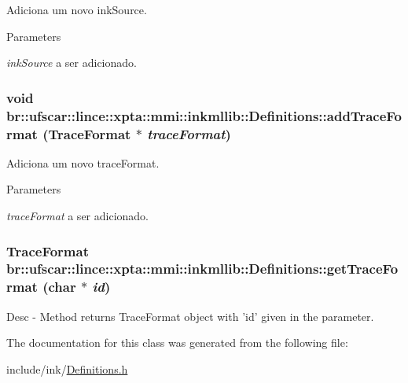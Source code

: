 Adiciona um novo inkSource. 


\begin{DoxyParams}{Parameters}
\item[{\em inkSource}]a ser adicionado. \end{DoxyParams}
\hypertarget{classbr_1_1ufscar_1_1lince_1_1xpta_1_1mmi_1_1inkmllib_1_1Definitions_afb1a42b76226bfb4e7bfb57d3a7d814f}{
\subsubsection[{addTraceFormat}]{\setlength{\rightskip}{0pt plus 5cm}void br::ufscar::lince::xpta::mmi::inkmllib::Definitions::addTraceFormat (TraceFormat $\ast$ {\em traceFormat})}}
\label{classbr_1_1ufscar_1_1lince_1_1xpta_1_1mmi_1_1inkmllib_1_1Definitions_afb1a42b76226bfb4e7bfb57d3a7d814f}


Adiciona um novo traceFormat. 


\begin{DoxyParams}{Parameters}
\item[{\em traceFormat}]a ser adicionado. \end{DoxyParams}
\hypertarget{classbr_1_1ufscar_1_1lince_1_1xpta_1_1mmi_1_1inkmllib_1_1Definitions_a76515ede42233e9cbbf922c298a7d082}{
\subsubsection[{getTraceFormat}]{\setlength{\rightskip}{0pt plus 5cm}TraceFormat br::ufscar::lince::xpta::mmi::inkmllib::Definitions::getTraceFormat (char $\ast$ {\em id})}}
\label{classbr_1_1ufscar_1_1lince_1_1xpta_1_1mmi_1_1inkmllib_1_1Definitions_a76515ede42233e9cbbf922c298a7d082}


Desc -\/ Method returns TraceFormat object with 'id' given in the parameter. 



The documentation for this class was generated from the following file:\begin{DoxyCompactItemize}
\item 
include/ink/\hyperlink{Definitions_8h}{Definitions.h}\end{DoxyCompactItemize}

